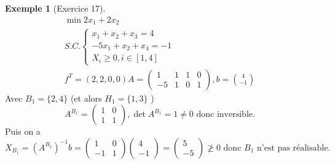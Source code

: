 \documentclass{article}
\theoremstyle{plain}%
\theoremstyle{definition}
\newtheorem{exmp}{Exemple}[section]
\theoremstyle{remark}
\begin{document}
\begin{exmp}[Exercice 17]
    \begin{align*}
        \min 2x_1 + 2x_2 \\
        S.C. \begin{cases}
        x_1 + x_2 + x_3 = 4 & \\
        -5x_1 + x_2 + x_4 = -1 & \\ 
        X_i \geq 0, i \in [1,4]
        \end{cases}  \\
        f^T = (2,2,0,0)
        A = \begin{pmatrix}
            1 & 1 & 1 & 0 \\
            -5 & 1 & 0 & 1
        \end{pmatrix}, b = \binom{4}{-1}
    \end{align*}
    Avec  $ B_1 = \{2,4\} $ (et alors $ H_1=\{1,3\} $ )
    \[
        A^{B_1} = \begin{pmatrix} 1 & 0 \\ 1 & 1\end{pmatrix}, \det A^{B_1} = 1 \neq 0 \text{ donc inversible}
    .\]
    Puis on a 
    \[
        X_{B_1} = (A^{B_1})^{-1}b = \begin{pmatrix}1 & 0 \\-1 & 1 \end{pmatrix} \begin{pmatrix}4 \\-1 \end{pmatrix} = \begin{pmatrix} 5 \\ -5 \end{pmatrix} \not \geq 0 \text{ donc }B_1 \text{ n'est pas réalisable}
    .\]



\end{exmp}
\end{document}
